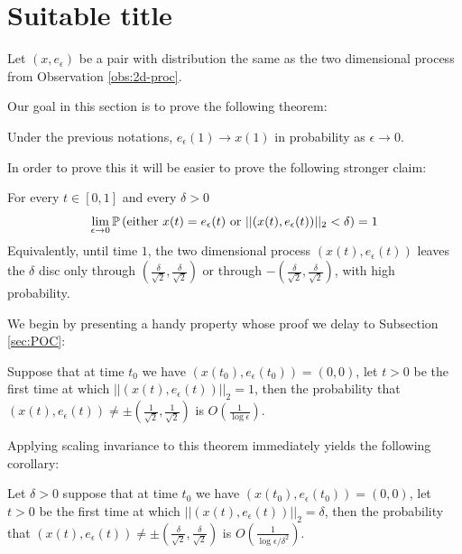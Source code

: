{
\newcommand{\eeps}{e_\epsilon}

\section{Suitable title}
Let $(x, \eeps)$ be a pair with distribution the same as the two
dimensional process from Observation \ref{obs:2d-proc}.

Our goal in this section is to prove the following theorem:
\begin{theorem}\label{thm:main1}
Under the previous notations, $\eeps(1) \to x(1)$ in probability
as $\epsilon \to 0$.
\end{theorem}

\newcommand{\radiussq}{\delta^2}
\newcommand{\radius}{\delta}
\newcommand{\twonorm}[1]{||#1||_2}

\newcommand{\twodproc}[1]{(x(#1), \eeps(#1))}

In order to prove this it will be easier to prove the following
stronger claim:
\begin{propos}\label{thm:main2}
For every $t\in[0,1]$ and every $\radius>0$
$$\ds \lim_{\epsilon \rightarrow 0}\P\left(\text{either } x(t)=\eeps(t)
\text{ or } \twonorm{\twodproc{t}} <\radius\right)=1$$
Equivalently, until time $1$, the two dimensional process $\twodproc{t}$
leaves the $\radius$ disc only through $(\frac{\radius}{\sqrt2},\frac{\radius}{\sqrt2})$ or through $-(\frac{\radius}{\sqrt2},\frac{\radius}{\sqrt2})$, with high probability.
\end{propos}

We begin by presenting a handy property whose proof
we delay to Subsection \ref{sec:POC}:

\begin{propos}\label{thm:no-escape}
Suppose that at time $t_0$ we have
$\twodproc{t_0}=(0,0)$, let $t>0$ be the first time at which
$\twonorm{\twodproc{t}}=1$, then the probability
that $\twodproc{t} \not=\pm(\frac{1}{\sqrt2},\frac{1}{\sqrt2})$ is $O(\frac1{\log\epsilon})$.
\end{propos}

Applying scaling invariance to this theorem immediately yields the
following corollary:
\begin{cor}\label{cor:cor1}
Let $\radius>0$ suppose that at time $t_0$ we have $\twodproc{t_0}=(0,0)$, let
$t>0$ be the first time at which
$\twonorm{\twodproc{t}} = \radius$, then the probability
that $\twodproc{t} \not=\pm(\frac{\radius}{\sqrt2},\frac{\radius}{\sqrt2})$ is
$O(\frac{1}{\log\epsilon/\radiussq})$.
\end{cor}

}
